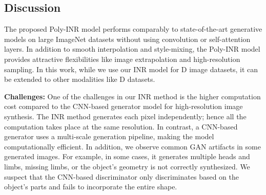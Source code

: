 \subsection{Discussion}
The proposed Poly-INR model performs comparably to state-of-the-art generative models on large ImageNet datasets without using convolution or self-attention layers. In addition to smooth interpolation and style-mixing, the Poly-INR model provides attractive flexibilities like image extrapolation and high-resolution sampling. In this work, while we use our INR model for D image datasets, it can be extended to other modalities like D datasets.

\noindent\textbf{Challenges:} One of the challenges in our INR method is the higher computation cost compared to the CNN-based generator model for high-resolution image synthesis. The INR method generates each pixel independently; hence all the computation takes place at the same resolution. In contrast, a CNN-based generator uses a multi-scale generation pipeline, making the model computationally efficient. In addition, we observe common GAN artifacts in some generated images. For example, in some cases, it generates multiple heads and limbs, missing limbs, or the object’s geometry is not correctly synthesized. We suspect that the CNN-based discriminator only discriminates based on the object's parts and fails to incorporate the entire shape.
















